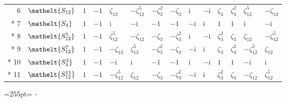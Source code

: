 \documentclass[10pt,a4paper]{article}
\newcommand{\needspace}[1]{\par\penalty-100\begingroup\dimen0=#1\relax\dimen2=\pagegoal
  \advance\dimen2-\pagetotal\ifdim\dimen0>\dimen2\relax\ifdim\dimen2>0pt\vfil\break\fi\fi
  \endgroup}
\numberwithin{equation}{section}
\newcommand{\eltfont}[1]{{\let\sigma\eltsigma\mathelt{#1}}}
\newcommand{\cls}[1]{\eltfont{#1}}
\newcommand{\iunit}{\mathrm{i}}
\newcommand{\rootunity}[1]{\zeta_{#1}}
\begin{document}
{\begin{longtable}{@{}rlllllllllllll@{}}
6 & $\cls{S_{12}}$ & $1$ & $-1$ & $\rootunity{12}$ & $-\rootunity{12}^{5}$ & $-\rootunity{3}^{2}$ & $-\rootunity{3}$ & $\iunit{}$ & $-\iunit{}$ & $\rootunity{3}$ & $\rootunity{3}^{2}$ & $\rootunity{12}^{5}$ & $-\rootunity{12}$\\*
7 & $\cls{S_{4}}$ & $1$ & $-1$ & $\iunit{}$ & $-\iunit{}$ & $-1$ & $-1$ & $-\iunit{}$ & $\iunit{}$ & $1$ & $1$ & $\iunit{}$ & $-\iunit{}$\\*
8 & $\cls{S_{12}^{5}}$ & $1$ & $-1$ & $\rootunity{12}^{5}$ & $-\rootunity{12}$ & $-\rootunity{3}$ & $-\rootunity{3}^{2}$ & $\iunit{}$ & $-\iunit{}$ & $\rootunity{3}^{2}$ & $\rootunity{3}$ & $\rootunity{12}$ & $-\rootunity{12}^{5}$\\*
9 & $\cls{S_{12}^{7}}$ & $1$ & $-1$ & $-\rootunity{12}$ & $\rootunity{12}^{5}$ & $-\rootunity{3}^{2}$ & $-\rootunity{3}$ & $-\iunit{}$ & $\iunit{}$ & $\rootunity{3}$ & $\rootunity{3}^{2}$ & $-\rootunity{12}^{5}$ & $\rootunity{12}$\\*
10 & $\cls{S_{4}^{3}}$ & $1$ & $-1$ & $-\iunit{}$ & $\iunit{}$ & $-1$ & $-1$ & $\iunit{}$ & $-\iunit{}$ & $1$ & $1$ & $-\iunit{}$ & $\iunit{}$\\*
11 & $\cls{S_{12}^{11}}$ & $1$ & $-1$ & $-\rootunity{12}^{5}$ & $\rootunity{12}$ & $-\rootunity{3}$ & $-\rootunity{3}^{2}$ & $-\iunit{}$ & $\iunit{}$ & $\rootunity{3}^{2}$ & $\rootunity{3}$ & $-\rootunity{12}$ & $\rootunity{12}^{5}$\\
\bottomrule\end{longtable}}
\needspace{255pt}
\end{document}
